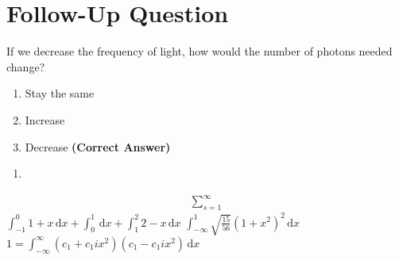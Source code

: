 \documentclass[12pt]{article}
\theoremstyle{definition} %
\theoremstyle{plain} %
\begin{document}
\section*{Follow-Up Question}

If we decrease the frequency of light, how would the number of photons needed change?
\begin{enumerate}
    \item Stay the same
    \item Increase
    \item Decrease \quad \textbf{(Correct Answer)}
\end{enumerate}

\noindent
\begin{enumerate}
  \item 
\end{enumerate}

\begin{align}
  \sum_{s=1}^{\infty} 
\end{align}
$\int_{-1}^{0} 1+x \,\mathrm{d}x + \int_{0}^{1}  \,\mathrm{d}x + \int_{1}^{2} 2-x \,\mathrm{d}x $ 
$\int_{-\infty}^{1} \sqrt{\frac{15}{56}}(1+x^{2})^{2}  \,\mathrm{d}x $ 
$1 =\int_{-\infty}^{\infty} (c_{1}+c_{1}ix^{2})(c_{1}-c_{1}ix^{2})     \,\mathrm{d}x $ 
\end{document}
